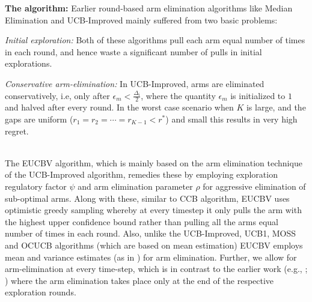 \textbf{The algorithm:} Earlier round-based arm elimination algorithms like Median Elimination \citep{even2006action} and UCB-Improved mainly suffered from two basic problems: \\
\begin{inparaenum}[\bfseries(i)]
\item \textit{Initial exploration:} Both of these algorithms pull each arm equal number of times in each round, and hence waste a significant number of pulls in initial explorations. \\
\item \textit{Conservative arm-elimination:} In UCB-Improved, arms are eliminated conservatively, i.e, only after $\epsilon_{m}<\frac{\Delta_{i}}{2}$, 
where the quantity $\epsilon_{m}$ is initialized to $1$ and halved after every round. In the worst case scenario when $K$ is large, and the gaps are uniform  ($r_{1}=r_{2}=\cdots=r_{K-1}<r^{*}$) and small this results in very high regret.\\
\end{inparaenum}
\\
	The EUCBV algorithm, which is mainly based on the arm elimination technique of the UCB-Improved algorithm,  remedies these by employing exploration regulatory factor $\psi$ and arm elimination parameter $\rho$ for aggressive elimination of sub-optimal arms. Along with these, similar to CCB \citep{liu2016modification} algorithm, EUCBV uses optimistic greedy sampling whereby at every timestep it only pulls the arm with the highest upper confidence bound rather than pulling all the arms equal number of times in each round. Also, unlike the UCB-Improved, UCB1, MOSS and OCUCB algorithms (which are based on mean estimation) EUCBV employs mean and variance estimates (as in \citet{audibert2009exploration}) for arm elimination. Further, we allow for arm-elimination at every time-step, which is in contrast to the earlier work (e.g., \citet{auer2010ucb}; \citet{even2006action}) where the arm elimination takes place only at the end of the respective exploration rounds. 




